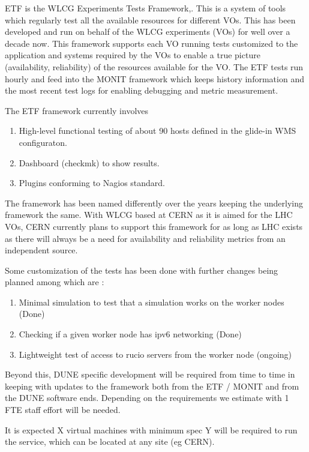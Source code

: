 \documentclass[../main-v1.tex]{subfiles}
\begin{document}
ETF is the WLCG Experiments Tests Framework\cite{bib:ETFDoc},\cite{bib:ETFStatus}. This is a system of tools which regularly test all the available resources for different VOs. This has been developed and run on behalf of the WLCG experiments (VOs) for well over a decade now. This framework supports each VO running tests customized to the application and systems required by the VOs to enable a true picture (availability, reliability) of the resources available for the VO. The ETF tests run hourly and feed into the MONIT framework which keeps history information and the most recent test logs for enabling debugging and metric measurement.

The ETF framework currently involves 
\begin{enumerate}
\item High-level functional testing of about 90 hosts defined in the glide-in WMS configuraton.
\item Dashboard (checkmk) to show results.
\item Plugins conforming to Nagios standard.
\end{enumerate}

The framework has been named differently over the years keeping the underlying framework the same. With WLCG based at CERN as it is aimed for the LHC VOs, CERN currently plans to support this framework for as long as LHC exists as there will always be a need for availability and reliability metrics from an independent source.

Some customization of the tests has been done with further changes being planned among which are :
\begin{enumerate}
    \item Minimal simulation to test that a simulation works on the worker nodes (Done)
    \item Checking if a given worker node has ipv6 networking (Done)
    \item Lightweight test of access to rucio servers from the worker node (ongoing)
\end{enumerate}

Beyond this, DUNE specific development will be required from time to time in keeping with updates to the framework both from the ETF / MONIT and from the DUNE software ends. Depending on the requirements we estimate  with 1 FTE staff effort will be needed.

It is expected X virtual machines with minimum spec Y will be required to run the service, which can be located at any site (eg CERN).
\end{document}
